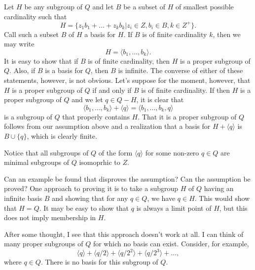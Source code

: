 \documentclass[12pt]{article}
\begin{document}
Let $H$ be any subgroup of $Q$ and
let $B$ be a subset of $H$ of smallest possible cardinality such that
\begin{equation*}
H=\{z_1b_1+\dots+z_kb_k|z_i\in Z, b_i\in B,k\in Z^{+}\}.
\end{equation*}
Call such a subset $B$ of $H$ a basis for $H$.  If $B$ is of finite
cardinality $k$, then we may write
\begin{equation*}
H = \langle b_1,\dots,b_k\rangle.
\end{equation*}
It is easy to show that if $B$ is of finite cardinality, then $H$ is a proper
subgroup of $Q$.  Also, if $B$ is a basis for $Q$, then $B$ is infinite.
The converse of either of these statements, however, is not obvious.
Let's suppose for the moment, however, that $H$ is a proper subgroup
of $Q$ if and only if $B$ is of finite cardinality.
If then $H$ is a proper subgroup of $Q$ and we let $q\in Q-H$, it is clear that
\begin{equation*}
\langle b_1,\dots,b_k\rangle+\langle q\rangle=\langle b_1,\dots,b_k,q\rangle
\end{equation*}
is a subgroup of $Q$ that properly contains $H$.  That it is a proper subgroup
of $Q$ follows from our assumption above and a realization that a basis
for $H+\langle q\rangle$ is $B\cup\{q\}$, which is clearly finite.

Notice that all subgroups of $Q$ of the form $\langle q\rangle$ for some non-zero $q\in Q$
are minimal subgroups of $Q$ isomoprhic to $Z$.

Can an example be found that disproves the assumption?  Can the assumption
be proved?  One approach to proving it is to take a subgroup $H$ of $Q$
having an infinite basis $B$ and showing that for any $q\in Q$, we have $q\in H$.
This would show that $H=Q$.  It may be easy to show that $q$ is always a limit
point of $H$, but this does not imply membership in $H$.

After some thought, I see that this approach doesn't work at all.
I can think of many proper subgroups of $Q$ for which no basis
can exist.  Consider, for example,
\begin{equation*}
\langle q\rangle+\langle q/2\rangle+\langle q/2^2\rangle+\langle q/2^3\rangle+\dots,
\end{equation*}
where $q\in Q$.  There is no basis for this subgroup of $Q$.
\end{document}
